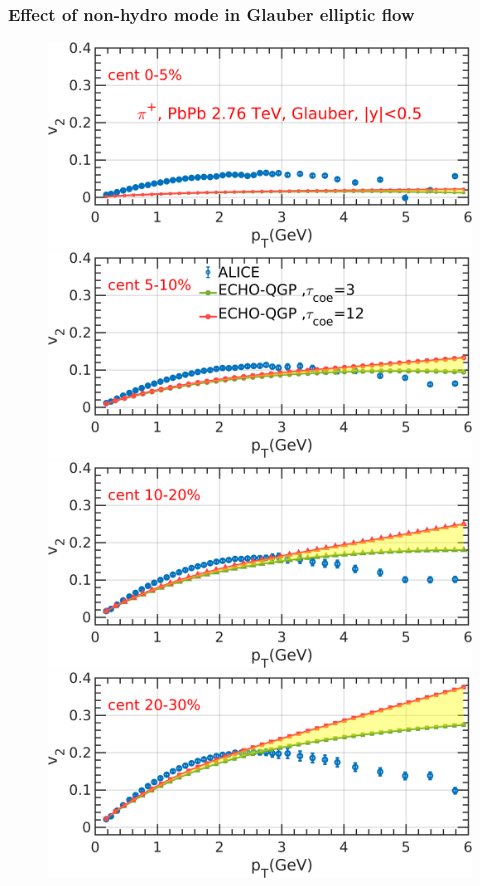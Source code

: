 \documentclass[aspectratio=1610]{beamer}
\begin{document}



\begin{frame}

\frametitle{Effect of non-hydro mode in Glauber elliptic flow}

\begin{figure}
\includegraphics[scale=0.19]{figs/3DGeometric/v2_pT0-5.png}
\includegraphics[scale=0.19]{figs/3DGeometric/v2_pT5-10.png}
\includegraphics[scale=0.19]{figs/3DGeometric/v2_pT10-20.png}
\includegraphics[scale=0.19]{figs/3DGeometric/v2_pT20-30.png}

\end{figure}
\end{frame}
\end{document}
